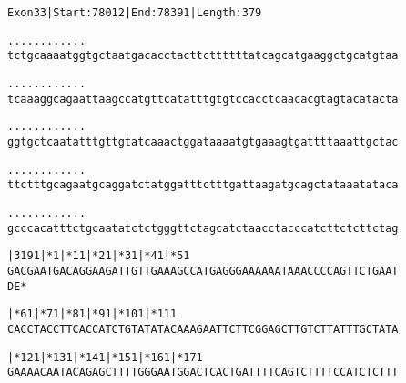 \documentclass{article}
\begin{document}
\newpage
\begin{alltt}
Exon 33 | Start: 78012 | End: 78391 | Length: 379

.    .    .    .    .    .    .    .    .    .    .    .
tctgcaaaatggtgctaatgacacctacttcttttttatcagcatgaaggctgcatgtaa



.    .    .    .    .    .    .    .    .    .    .    .
tcaaaggcagaattaagccatgttcatatttgtgtccacctcaacacgtagtacatacta



.    .    .    .    .    .    .    .    .    .    .    .
ggtgctcaatatttgttgtatcaaactggataaaatgtgaaagtgattttaaattgctac



.    .    .    .    .    .    .    .    .    .    .    .
ttctttgcagaatgcaggatctatggatttctttgattaagatgcagctataaatataca



.    .    .    .    .    .    .    .    .    .    .    .
gcccacatttctgcaatatctctgggttctagcatctaacctacccatcttctcttctag



    |3191|*1       |*11      |*21      |*31      |*41      |*51
GACGAATGACAGGAAGATTGTTGAAAGCCATGAGGGAAAAAATAAACCCCAGTTCTGAAT
D  E  *


         |*61      |*71      |*81      |*91      |*101     |*111
CACCTACCTTCACCATCTGTATATACAAAGAATTCTTCGGAGCTTGTCTTATTTGCTATA



         |*121     |*131     |*141     |*151     |*161     |*171
GAAAACAATACAGAGCTTTTGGGAATGGACTCACTGATTTTCAGTCTTTTCCATCTCTTT



\end{alltt}
\newpage
\end{document}
